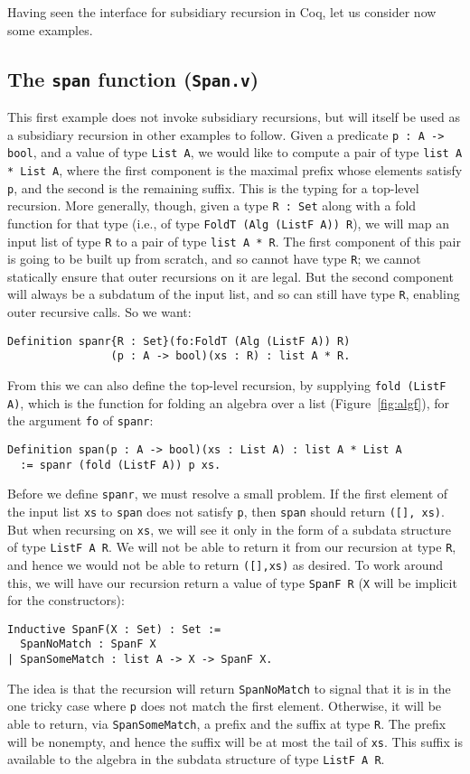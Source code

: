 \documentclass[a4paper,USenglish]{lipics-v2021}
\begin{document}
Having seen the interface for subsidiary recursion in Coq, let us
consider now some examples.  

\subsection{The \texttt{span} function (\texttt{Span.v})}

This first example does not invoke subsidiary recursions, but will
itself be used as a subsidiary recursion in other examples to follow.
Given a predicate \verb|p : A -> bool|, and a value of type
\verb|List A|, we would like to compute a pair of type
\verb|list A * List A|, where the first component is the maximal
prefix whose elements satisfy \verb|p|, and the second is the
remaining suffix.  This is the typing for a top-level recursion.  More
generally, though, given a type \verb|R : Set| along with a
fold function for that type (i.e., of type
\verb|FoldT (Alg (ListF A)) R|), we will map an input list of
type \verb|R| to a pair of type \verb|list A * R|.  The first
component of this pair is going to be built up from scratch, and so
cannot have type \verb|R|; we cannot statically ensure that outer
recursions on it are legal.  But the second component will always be a
subdatum of the input list, and so can still have type \verb|R|,
enabling outer recursive calls.  So we want:
\begin{verbatim}
Definition spanr{R : Set}(fo:FoldT (Alg (ListF A)) R)
                (p : A -> bool)(xs : R) : list A * R.
\end{verbatim}
\noindent From this we can also define the top-level recursion, by
supplying \verb|fold (ListF A)|, which is the function for folding an algebra
over a list (Figure~\ref{fig:algf}), for the argument \verb|fo| of \verb|spanr|:
\begin{verbatim}
Definition span(p : A -> bool)(xs : List A) : list A * List A
  := spanr (fold (ListF A)) p xs.
\end{verbatim}

Before we define \verb|spanr|, we must resolve a small problem.
If the first element of the input list
\verb|xs| to \verb|span| does not satisfy \verb|p|, then \verb|span|
should return \verb|([], xs)|.  But when recursing on \verb|xs|, we
will see it only in the form of a subdata structure of type
\verb|ListF A R|.  We will not be able to return it from our recursion at
type \verb|R|, and hence we would not be able to return \verb|([],xs)|
as desired.  To work around this, we will have our recursion return a value
of type \verb|SpanF R| (\verb|X| will be implicit for the constructors):
\begin{verbatim}
Inductive SpanF(X : Set) : Set :=
  SpanNoMatch : SpanF X
| SpanSomeMatch : list A -> X -> SpanF X.
\end{verbatim}
\noindent The idea is that the recursion will return \verb|SpanNoMatch| to signal that it is in the
one tricky case where \verb|p| does not match the first element.  Otherwise, it will be able to return,
via \verb|SpanSomeMatch|, a prefix and the suffix at type
\verb|R|. The prefix will be nonempty, and hence the suffix will be at
most the tail of \verb|xs|.  This suffix is available to the algebra
in the subdata structure of type \verb|ListF A R|.
\end{document}

